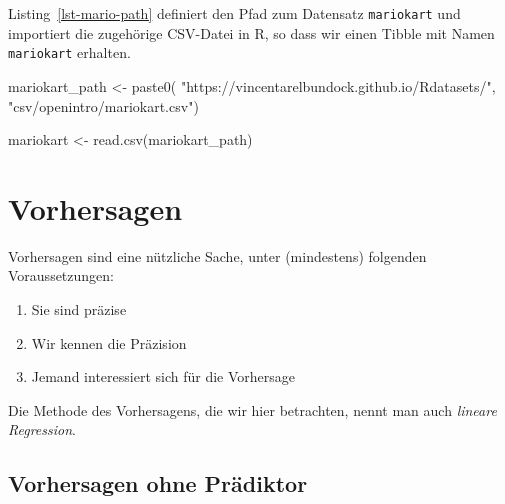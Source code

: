 \documentclass[
  letterpaper,
]{scrbook}
\newenvironment{Shaded}{\begin{snugshade}}{\end{snugshade}}
\newcommand{\FunctionTok}[1]{\textcolor[rgb]{0.28,0.35,0.67}{#1}}
\newcommand{\NormalTok}[1]{\textcolor[rgb]{0.00,0.23,0.31}{#1}}
\newcommand{\OtherTok}[1]{\textcolor[rgb]{0.00,0.23,0.31}{#1}}
\newcommand{\StringTok}[1]{\textcolor[rgb]{0.13,0.47,0.30}{#1}}
\providecommand{\tightlist}{%
  \setlength{\itemsep}{0pt}\setlength{\parskip}{0pt}}\usepackage{longtable,booktabs,array}
\theoremstyle{definition}
\theoremstyle{definition}
\theoremstyle{definition}
\theoremstyle{remark}
\begin{document}
Listing~\ref{lst-mario-path} definiert den Pfad zum Datensatz
\texttt{mariokart} und importiert die zugehörige CSV-Datei in R, so dass
wir einen Tibble mit Namen \texttt{mariokart} erhalten.

\begin{Shaded}
\begin{Highlighting}[]
\NormalTok{mariokart\_path }\OtherTok{\textless{}{-}} \FunctionTok{paste0}\NormalTok{(}
  \StringTok{"https://vincentarelbundock.github.io/Rdatasets/"}\NormalTok{,}
  \StringTok{"csv/openintro/mariokart.csv"}\NormalTok{)}

\NormalTok{mariokart }\OtherTok{\textless{}{-}} \FunctionTok{read.csv}\NormalTok{(mariokart\_path)}
\end{Highlighting}
\end{Shaded}

\section{Vorhersagen}\label{vorhersagen}

Vorhersagen sind eine nützliche Sache, unter (mindestens) folgenden
Voraussetzungen:

\begin{enumerate}
\def\labelenumi{\arabic{enumi}.}
\tightlist
\item
  Sie sind präzise
\item
  Wir kennen die Präzision
\item
  Jemand interessiert sich für die Vorhersage
\end{enumerate}

Die Methode des Vorhersagens, die wir hier betrachten, nennt man auch
\emph{lineare Regression}.

\subsection{Vorhersagen ohne
Prädiktor}\label{vorhersagen-ohne-pruxe4diktor}
\end{document}
